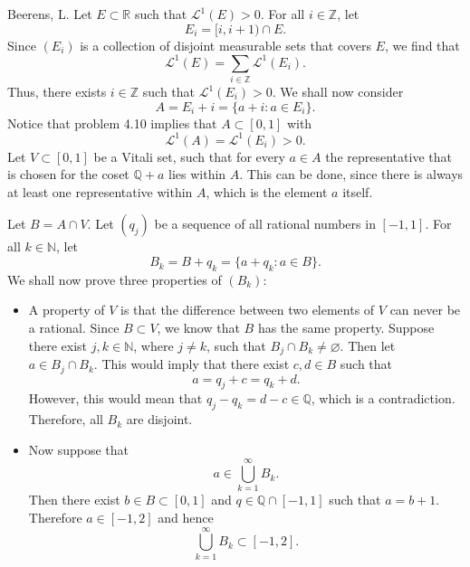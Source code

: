 \begin{solution}[4.8]{Beerens, L.}
    Let $E\subset \mathbb{R}$ such that $\mathcal{L}^1(E)>0$. For all $i\in\mathbb{Z}$, let
    $$
        E_i = [i,i+1)\cap E.
    $$
    Since $(E_i)$ is a collection of disjoint measurable sets that covers $E$, we find that
    $$
        \mathcal{L}^1(E) = \sum_{i\in\mathbb{Z}}\mathcal{L}^1(E_i).
    $$
    Thus, there exists $i\in\mathbb{Z}$ such that $\mathcal{L}^1(E_i) >0$.
    We shall now consider 
    $$
        A = E_i + i = \{a+i:a\in E_i\}.
    $$
    Notice that problem 4.10 implies that $A\subset[0,1]$ with 
    $$
        \mathcal{L}^1(A) = \mathcal{L}^1(E_i)>0.
    $$ 
    Let $V\subset[0,1]$ be a Vitali set, such that for every $a\in A$ the representative that is chosen for the coset $\mathbb{Q}+a$ lies within $A$. This can be done, since there is always at least one representative within $A$, which is the element $a$ itself.
    
    Let $B=A\cap V$. Let $(q_j)$ be a sequence of all rational numbers in $[-1,1]$. For all $k\in\mathbb{N}$, let
    $$
        B_k = B+ q_k = \{a+q_k:a\in B\}.
    $$
    We shall now prove three properties of $(B_k)$:
    \begin{itemize}
        \item A property of $V$ is that the difference between two elements of $V$ can never be a rational. Since $B\subset V$, we know that $B$ has the same property. Suppose there exist $j,k\in\mathbb{N}$, where $j\neq k$, such that $B_j\cap B_k\neq\varnothing$. Then let $a\in B_j\cap B_k$. This would imply that there exist $c,d\in B$ such that
        $$
            a = q_j + c = q_k + d.
        $$
        However, this would mean that $q_j-q_k = d-c\in\mathbb{Q}$, which is a contradiction. Therefore, all $B_k$ are disjoint. 
        
        \item Now suppose that 
        $$
            a\in\bigcup_{k=1}^\infty B_k.
        $$
        Then there exist $b\in B\subset[0,1]$ and $q\in\mathbb{Q}\cap[-1,1]$ such that $a=b+1$. Therefore $a\in[-1,2]$ and hence 
        $$
            \bigcup_{k=1}^\infty B_k \subset [-1,2].
        $$
        

\end{itemize}
\end{solution}
